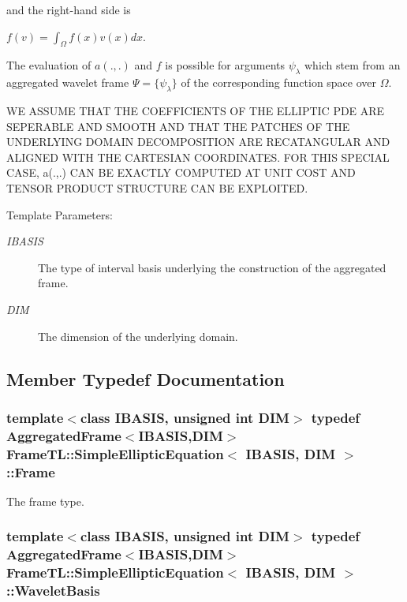 and the right-hand side is

$f(v) = \int_\Omega f(x) v(x) dx$.

The evaluation of $a(.,.)$ and $f$ is possible for arguments $\psi_\lambda$ which stem from an aggregated wavelet frame $\Psi=\{\psi_\lambda\}$ of the corresponding function space over $\Omega$.

WE ASSUME THAT THE COEFFICIENTS OF THE ELLIPTIC PDE ARE SEPERABLE AND SMOOTH AND THAT THE PATCHES OF THE UNDERLYING DOMAIN DECOMPOSITION ARE RECATANGULAR AND ALIGNED WITH THE CARTESIAN COORDINATES. FOR THIS SPECIAL CASE, a(.,.) CAN BE EXACTLY COMPUTED AT UNIT COST AND TENSOR PRODUCT STRUCTURE CAN BE EXPLOITED.

\begin{Desc}
\item[Template Parameters:]
\begin{description}
\item[{\em IBASIS}]The type of interval basis underlying the construction of the aggregated frame. \item[{\em DIM}]The dimension of the underlying domain. \end{description}
\end{Desc}


\subsection{Member Typedef Documentation}
\hypertarget{classFrameTL_1_1SimpleEllipticEquation_b048afa8f64d6e76d33b1ae60686010a}{
\subsubsection[Frame]{\setlength{\rightskip}{0pt plus 5cm}template$<$class IBASIS, unsigned int DIM$>$ {\bf typedef} {\bf AggregatedFrame}$<$IBASIS,DIM$>$ {\bf FrameTL::SimpleEllipticEquation}$<$ IBASIS, DIM $>$::{\bf Frame}}}
\label{classFrameTL_1_1SimpleEllipticEquation_b048afa8f64d6e76d33b1ae60686010a}


The frame type. \hypertarget{classFrameTL_1_1SimpleEllipticEquation_59ee36b9fe6e6aab5b0947de8487c95e}{
\subsubsection[WaveletBasis]{\setlength{\rightskip}{0pt plus 5cm}template$<$class IBASIS, unsigned int DIM$>$ {\bf typedef} {\bf AggregatedFrame}$<$IBASIS,DIM$>$ {\bf FrameTL::SimpleEllipticEquation}$<$ IBASIS, DIM $>$::{\bf WaveletBasis}}}
\label{classFrameTL_1_1SimpleEllipticEquation_59ee36b9fe6e6aab5b0947de8487c95e}



